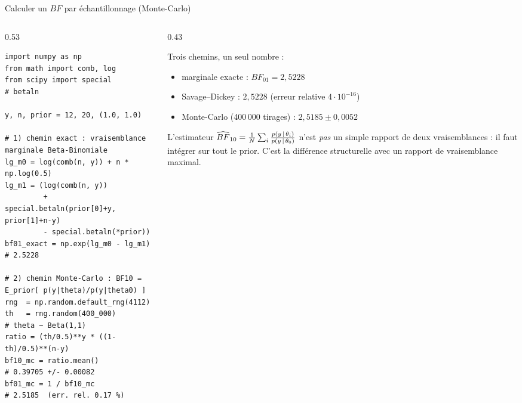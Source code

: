 \begin{frame}[fragile]{Calculer un $BF$ par échantillonnage (Monte-Carlo)}
\footnotesize
\begin{columns}[t]
\begin{column}{0.53\textwidth}
\begin{codebox}
\begin{lstlisting}[style=py]
import numpy as np
from math import comb, log
from scipy import special          # betaln

y, n, prior = 12, 20, (1.0, 1.0)

# 1) chemin exact : vraisemblance marginale Beta-Binomiale
lg_m0 = log(comb(n, y)) + n * np.log(0.5)
lg_m1 = (log(comb(n, y))
         + special.betaln(prior[0]+y, prior[1]+n-y)
         - special.betaln(*prior))
bf01_exact = np.exp(lg_m0 - lg_m1)          # 2.5228

# 2) chemin Monte-Carlo : BF10 = E_prior[ p(y|theta)/p(y|theta0) ]
rng  = np.random.default_rng(4112)
th   = rng.random(400_000)                  # theta ~ Beta(1,1)
ratio = (th/0.5)**y * ((1-th)/0.5)**(n-y)
bf10_mc = ratio.mean()                      # 0.39705 +/- 0.00082
bf01_mc = 1 / bf10_mc                       # 2.5185  (err. rel. 0.17 %)
\end{lstlisting}
\end{codebox}
\end{column}
\begin{column}{0.43\textwidth}
\begin{solbox}
Trois chemins, un seul nombre :
\begin{itemize}
  \item marginale exacte : $BF_{01} = 2{,}5228$
  \item Savage--Dickey : $2{,}5228$ (erreur relative $4\cdot10^{-16}$)
  \item Monte-Carlo (400\,000 tirages) : $2{,}5185 \pm 0{,}0052$
\end{itemize}
\vspace{1mm}
\footnotesize L'estimateur $\widehat{BF}_{10} = \frac1N\sum_i \frac{p(y \,\vert\, \theta_i)}{p(y \,\vert\, \theta_0)}$
n'est \emph{pas} un simple rapport de deux vraisemblances : il faut intégrer sur tout
le prior. C'est la différence structurelle avec un rapport de vraisemblance maximal.
\end{solbox}
\end{column}
\end{columns}
\end{frame}

